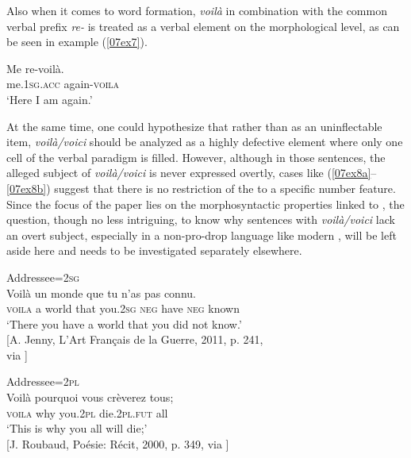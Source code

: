 \documentclass[output=paper,colorlinks,citecolor=brown]{langscibook}
\begin{document}
Also when it comes to word formation, \emph{voilà} in combination with the common verbal prefix \emph{re-} is treated as a verbal element on the morphological level, as can be seen in example (\ref{07ex7}).

\begin{exe}
	\ex \label{07ex7} \gll Me re-voilà. \\
	me.\textsc{1sg.acc} again-\textsc{voila} \\
	\trans ‘Here I am again.’
\end{exe}

At the same time, one could hypothesize that rather than as an uninflectable item, \emph{voilà/voici} should be analyzed as a highly defective element where only one cell of the verbal paradigm is filled. However, although in those  sentences, the alleged subject of \emph{voilà/voici} is never expressed overtly, cases like (\ref{07ex8a}--\ref{07ex8b}) suggest that there is no restriction of the  to a specific number feature. Since the focus of the paper lies on the morphosyntactic properties linked to , the question, though no less intriguing, to know why sentences with \emph{voilà/voici} lack an overt subject, especially in a non-pro-drop language like modern , will be left aside here and needs to be investigated separately elsewhere.

\begin{exe}
	\ex
	\begin{xlist}
		\ex \label{07ex8a} Addressee=\textsc{2sg}  \\
		\gll Voilà un monde que tu n’as pas connu. \\
		\textsc{voila} a world that you.\textsc{2sg} {\textsc{neg} have} \textsc{neg} known \\
		\trans ‘There you have a world that you did not know.’ \\
		\hfill [A. Jenny, L’Art Français de la Guerre, 2011, p. 241, \\
		\hfill via \citeauthor{frantext}]
		
		\ex \label{07ex8b} Addressee=\textsc{2pl}  \\
		\gll Voilà pourquoi vous crèverez tous; \\
		\textsc{voila} why you.\textsc{2pl} die.\textsc{2pl.fut} all \\
		\trans ‘This is why you all will die;’ \\
		\hfill [J. Roubaud, Poésie: Récit, 2000, p. 349, via \citeauthor{frantext}]
	\end{xlist}
\end{exe}
\end{document}
